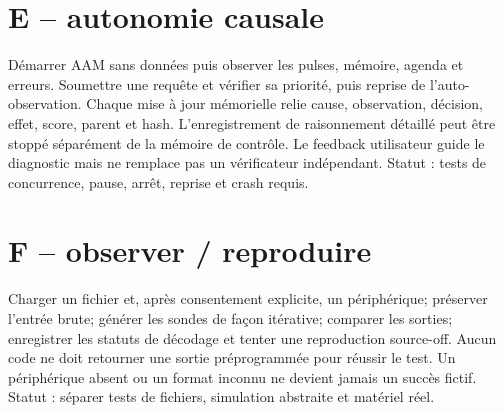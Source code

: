 \documentclass[11pt,a4paper]{report}
\begin{document}
\section{E -- autonomie causale}Démarrer AAM sans données puis observer les pulses, mémoire, agenda et erreurs. Soumettre une requête et vérifier sa priorité, puis reprise de l'auto-observation. Chaque mise à jour mémorielle relie cause, observation, décision, effet, score, parent et hash. L'enregistrement de raisonnement détaillé peut être stoppé séparément de la mémoire de contrôle. Le feedback utilisateur guide le diagnostic mais ne remplace pas un vérificateur indépendant. Statut : tests de concurrence, pause, arrêt, reprise et crash requis.
\section{F -- observer / reproduire}Charger un fichier et, après consentement explicite, un périphérique; préserver l'entrée brute; générer les sondes de façon itérative; comparer les sorties; enregistrer les statuts de décodage et tenter une reproduction source-off. Aucun code ne doit retourner une sortie préprogrammée pour réussir le test. Un périphérique absent ou un format inconnu ne devient jamais un succès fictif. Statut : séparer tests de fichiers, simulation abstraite et matériel réel.
\end{document}
